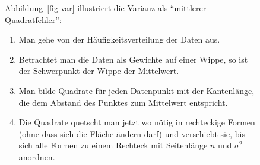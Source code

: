 \documentclass[
  letterpaper,
]{scrbook}
\providecommand{\tightlist}{%
  \setlength{\itemsep}{0pt}\setlength{\parskip}{0pt}}\usepackage{longtable,booktabs,array}
\theoremstyle{definition}
\theoremstyle{definition}
\theoremstyle{definition}
\theoremstyle{remark}
\begin{document}
\begin{figure}

\begin{minipage}{0.60\linewidth}
Abbildung~\ref{fig-var} illustriert die Varianz als \enquote{mittlerer
Quadratfehler}:

\begin{enumerate}
\def\labelenumi{\arabic{enumi}.}
\tightlist
\item
  Man gehe von der Häufigkeitsverteilung der Daten aus.
\item
  Betrachtet man die Daten als Gewichte auf einer Wippe, so ist der
  Schwerpunkt der Wippe der Mittelwert.
\item
  Man bilde Quadrate für jeden Datenpunkt mit der Kantenlänge, die dem
  Abstand des Punktes zum Mittelwert entspricht.
\item
  Die Quadrate quetscht man jetzt wo nötig in rechteckige Formen (ohne
  dass sich die Fläche ändern darf) und verschiebt sie, bis sich alle
  Formen zu einem Rechteck mit Seitenlänge \(n\) und \(\sigma^2\)
  anordnen.
\end{enumerate}

\end{minipage}%
%
\begin{minipage}{0.40\linewidth}

\begin{figure}[H]

\centering{

}
\end{figure}
\end{minipage}
\end{figure}
\end{document}
